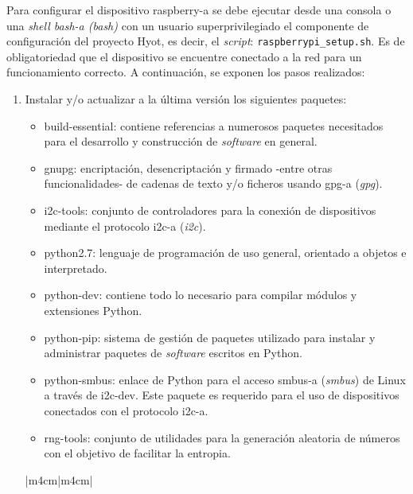 \documentclass[12pt,a4paper, twoside]{report}
\begin{document}
	Para configurar el dispositivo \gls{raspberry-a} se debe ejecutar desde una consola o una \textit{\gls{shell} \gls{bash-a} (\textit{\gls{bash}})} con un usuario superprivilegiado el componente de configuración del proyecto Hyot, es decir, el \textit{\gls{script}}: \texttt{raspberrypi\_setup.sh}.  Es de obligatoriedad que el dispositivo se encuentre conectado a la red para un funcionamiento correcto. A continuación, se exponen los pasos realizados: 
	
	\begin{enumerate}
		\item Instalar y/o actualizar a la última versión los siguientes paquetes:
	
		\begin{itemize}
			\item build-essential: contiene referencias a numerosos paquetes necesitados para el desarrollo y construcción de \textit{software} en general.
			\item gnupg: encriptación, desencriptación y firmado -entre otras funcionalidades- de cadenas de texto y/o ficheros usando \gls{gpg-a} (\textit{\gls{gpg}}).
			\item i2c-tools: conjunto de controladores para la conexión de dispositivos mediante el protocolo \gls{i2c-a} (\textit{\gls{i2c}}).
			\item python2.7: lenguaje de programación de uso general, orientado a objetos e interpretado.
			\item python-dev: contiene todo lo necesario para compilar módulos y extensiones Python.
			\item python-pip: sistema de gestión de paquetes utilizado para instalar y administrar paquetes de \textit{software} escritos en Python.
			\item python-smbus: enlace de Python para el acceso \gls{smbus-a} (\textit{\gls{smbus}}) de Linux a través de i2c-dev. Este paquete es requerido para el uso de dispositivos conectados con el protocolo \gls{i2c-a}.
			\item rng-tools: conjunto de utilidades para la generación aleatoria de números con el objetivo de facilitar la \gls{entropia}.
		\end{itemize}
		
		\begin{longtable}{|m{4cm}|m{4cm}|}
			\hline
			
			 \\ \hline
		

\end{longtable}
\end{enumerate}
\end{document}
